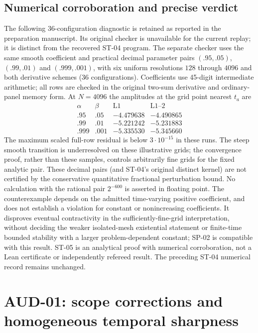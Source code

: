 \documentclass[11pt,a4paper]{amsart}
\theoremstyle{remark}
\theoremstyle{plain}
\theoremstyle{remark}
\numberwithin{equation}{section}
\begin{document}
\subsection{Numerical corroboration and precise verdict}
The following 36-configuration diagnostic is retained as reported in the preparation manuscript. Its original checker is unavailable for the current replay; it is distinct from the recovered ST-04 program.
The separate checker uses the same smooth coefficient and practical decimal parameter pairs $(.95,.05)$, $(.99,.01)$ and $(.999,.001)$, with six uniform resolutions $128$ through $4096$ and both derivative schemes (36 configurations). Coefficients use 45-digit intermediate arithmetic; all rows are checked in the original two-sum derivative and ordinary-panel memory form. At $N=4096$ the amplitudes at the grid point nearest $t_a$ are
\[
\begin{array}{cc|rr}
\alpha&\beta&\text{L1}&\text{L1--2}\\\hline
.95&.05&-4.479638&-4.490865\\
.99&.01&-5.221242&-5.231883\\
.999&.001&-5.335530&-5.345660
\end{array}
\]
The maximum scaled full-row residual is below $3\cdot10^{-15}$ in these runs. The steep smooth transition is underresolved on these illustrative grids; the convergence proof, rather than these samples, controls arbitrarily fine grids for the fixed analytic pair. These decimal pairs (and ST-04's original distinct kernel) are not certified by the conservative quantitative fractional perturbation bound. No calculation with the rational pair $2^{-600}$ is asserted in floating point. The counterexample depends on the admitted time-varying positive coefficient, and does not establish a violation for constant or nonincreasing coefficients. It disproves eventual contractivity in the sufficiently-fine-grid interpretation, without deciding the weaker isolated-mesh existential statement or finite-time bounded stability with a larger problem-dependent constant; SP-02 is compatible with this result. ST-05 is an analytical proof with numerical corroboration, not a Lean certificate or independently refereed result. The preceding ST-04 numerical record remains unchanged.


\section{AUD-01: scope corrections and homogeneous temporal sharpness}
\label{sec:aud01}
\end{document}
